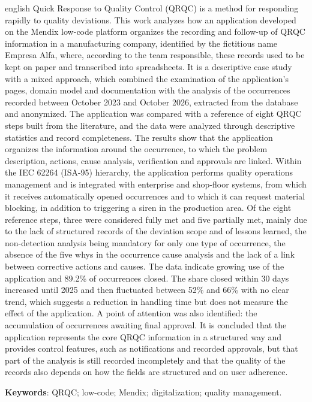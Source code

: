 \begin{resumo}[ABSTRACT]
\begin{otherlanguage*}{english}
Quick Response to Quality Control (QRQC) is a method for responding rapidly to quality deviations. This work analyzes how an application developed on the Mendix low-code platform organizes the recording and follow-up of QRQC information in a manufacturing company, identified by the fictitious name Empresa Alfa, where, according to the team responsible, these records used to be kept on paper and transcribed into spreadsheets. It is a descriptive case study with a mixed approach, which combined the examination of the application's pages, domain model and documentation with the analysis of the occurrences recorded between October 2023 and October 2026, extracted from the database and anonymized. The application was compared with a reference of eight QRQC steps built from the literature, and the data were analyzed through descriptive statistics and record completeness. The results show that the application organizes the information around the occurrence, to which the problem description, actions, cause analysis, verification and approvals are linked. Within the IEC 62264 (ISA-95) hierarchy, the application performs quality operations management and is integrated with enterprise and shop-floor systems, from which it receives automatically opened occurrences and to which it can request material blocking, in addition to triggering a siren in the production area. Of the eight reference steps, three were considered fully met and five partially met, mainly due to the lack of structured records of the deviation scope and of lessons learned, the non-detection analysis being mandatory for only one type of occurrence, the absence of the five whys in the occurrence cause analysis and the lack of a link between corrective actions and causes. The data indicate growing use of the application and 89.2\% of occurrences closed. The share closed within 30 days increased until 2025 and then fluctuated between 52\% and 66\% with no clear trend, which suggests a reduction in handling time but does not measure the effect of the application. A point of attention was also identified: the accumulation of occurrences awaiting final approval. It is concluded that the application represents the core QRQC information in a structured way and provides control features, such as notifications and recorded approvals, but that part of the analysis is still recorded incompletely and that the quality of the records also depends on how the fields are structured and on user adherence.

\textbf{Keywords}: QRQC; low-code; Mendix; digitalization; quality management.
\end{otherlanguage*}
\end{resumo}
